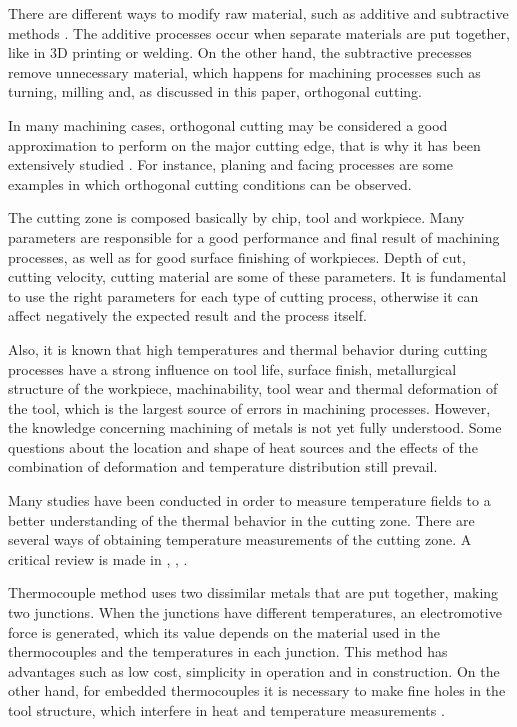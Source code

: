 	There are different ways to modify raw material, such as additive and subtractive methods \cite{shaw2005metal}. The additive processes occur when separate materials are put together, like in 3D printing or welding. On the other hand, the subtractive precesses remove unnecessary material, which happens for machining processes such as turning, milling and, as discussed in this paper, orthogonal cutting. 

	In many machining cases, orthogonal cutting may be considered a good approximation to perform on the major cutting edge, that is why it has been extensively studied \cite{shaw2005metal}. For instance, planing and facing processes are some examples in which orthogonal cutting conditions can be observed.

	The cutting zone is composed basically by chip, tool and workpiece. Many parameters are responsible for a good performance and final result of machining processes, as well as for good surface finishing of workpieces. Depth of cut, cutting velocity, cutting material are some of these parameters. It is fundamental to use the right parameters for each type of cutting process, otherwise it can affect negatively the expected result and the process itself.

	Also, it is known that high temperatures and thermal behavior during cutting processes have a strong influence on tool life, surface finish, metallurgical structure of the workpiece, machinability, tool wear and thermal deformation of the tool, which is the largest source of errors in machining processes. However, the knowledge concerning machining of metals is not yet fully understood. Some questions about the location and shape of heat sources and the effects of the combination of deformation and temperature distribution still prevail.

	Many studies have been conducted in order to measure temperature fields to a better understanding of the thermal behavior in the cutting zone. There are several ways of obtaining temperature measurements of the cutting zone. A critical review is made in \cite{komanduri2000thermal}, \cite{komanduri2001thermal}, \cite{abukhshim2006heat}.

	Thermocouple method uses two dissimilar metals that are put together, making two junctions. When the junctions have different temperatures, an electromotive force is generated, which its value depends on the material used in the thermocouples and the temperatures in each junction. This method has advantages such as low cost, simplicity in operation and in construction. On the other hand, for embedded thermocouples it is necessary to make fine holes in the tool structure, which interfere in heat and temperature measurements \cite{komanduri2001thermal}.

